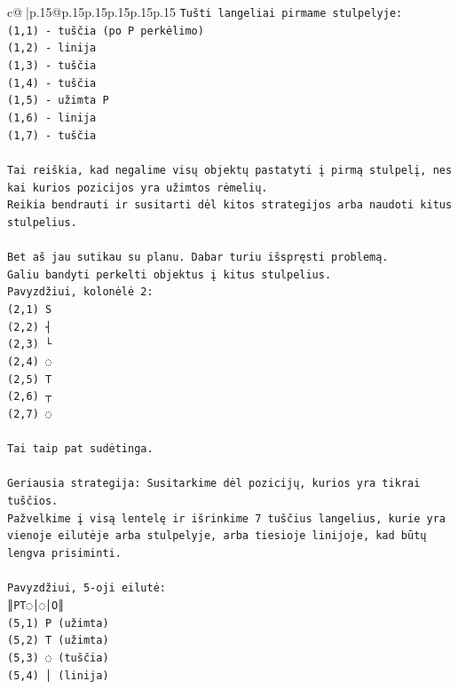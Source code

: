\documentclass{article}
\begin{document}
{\begin{supertabular}{c@{$\;$}|p{.15\linewidth}@{}p{.15\linewidth}p{.15\linewidth}p{.15\linewidth}p{.15\linewidth}p{.15\linewidth}}
{{{\texttt{Tušti langeliai pirmame stulpelyje:} \\
\texttt{(1,1) {-} tuščia (po P perkėlimo)} \\
\texttt{(1,2) {-} linija} \\
\texttt{(1,3) {-} tuščia} \\
\texttt{(1,4) {-} tuščia} \\
\texttt{(1,5) {-} užimta P} \\
\texttt{(1,6) {-} linija} \\
\texttt{(1,7) {-} tuščia} \\
\\ 
\texttt{Tai reiškia, kad negalime visų objektų pastatyti į pirmą stulpelį, nes kai kurios pozicijos yra užimtos rėmelių.} \\
\texttt{Reikia bendrauti ir susitarti dėl kitos strategijos arba naudoti kitus stulpelius.} \\
\\ 
\texttt{Bet aš jau sutikau su planu. Dabar turiu išspręsti problemą.} \\
\texttt{Galiu bandyti perkelti objektus į kitus stulpelius.} \\
\texttt{Pavyzdžiui, kolonėlė 2:} \\
\texttt{(2,1) S} \\
\texttt{(2,2) ┤} \\
\texttt{(2,3) └} \\
\texttt{(2,4) ◌} \\
\texttt{(2,5) T} \\
\texttt{(2,6) ┬} \\
\texttt{(2,7) ◌} \\
\\ 
\texttt{Tai taip pat sudėtinga.} \\
\\ 
\texttt{Geriausia strategija: Susitarkime dėl pozicijų, kurios yra tikrai tuščios.} \\
\texttt{Pažvelkime į visą lentelę ir išrinkime 7 tuščius langelius, kurie yra vienoje eilutėje arba stulpelyje, arba tiesioje linijoje, kad būtų lengva prisiminti.} \\
\\ 
\texttt{Pavyzdžiui, 5{-}oji eilutė:} \\
\texttt{║PT◌│◌│O║} \\
\texttt{(5,1) P (užimta)} \\
\texttt{(5,2) T (užimta)} \\
\texttt{(5,3) ◌ (tuščia)} \\
\texttt{(5,4) │ (linija)} \\
}}}
\end{supertabular}}
\end{document}
